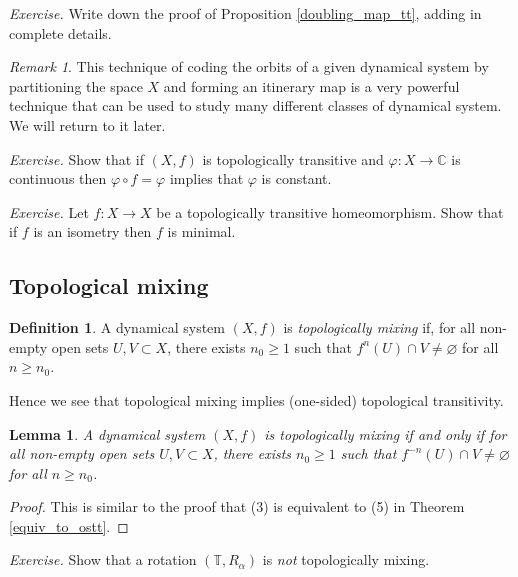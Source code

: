 \documentclass[12pt]{article}
\newtheorem{lemma}[theorem]{Lemma}
\theoremstyle{definition}
\newtheorem{definition}[theorem]{Definition}
\theoremstyle{remark}
\newtheorem{remark}[theorem]{Remark}
\begin{document}
\medskip
\noindent
{\it Exercise.}
Write down
the proof of Proposition \ref{doubling_map_tt}, adding in complete details.

\medskip
\noindent
\begin{remark}
This technique of coding the orbits of a given dynamical system by
partitioning the space $X$ and forming an itinerary map is a very
powerful technique that can be used to study many different classes of
dynamical system. We will return to it later.
\end{remark}

\medskip
\noindent
{\it Exercise.}
Show that if $(X,f)$ is topologically transitive and $\varphi: X \to \mathbb C$ is continuous
then $\varphi \circ f = \varphi$ implies that $\varphi$ is constant.


\medskip
\noindent
{\it Exercise.}
Let $f : X \to X$ be a topologically transitive homeomorphism. Show that if $f$ is an isometry then 
$f$ is minimal. %



\subsection{Topological mixing}

\begin{definition}
A dynamical system $(X,f)$ is {\it topologically mixing} if, for all non-empty open sets $U,V \subset X$,
there exists $n_0 \ge 1$ such that $f^{n}(U) \cap V \ne \varnothing$ for all $n \ge n_0$.
\end{definition}

Hence we see that topological mixing
implies (one-sided) topological transitivity.

\begin{lemma}
A dynamical system $(X,f)$ is topologically mixing if and only if
for all non-empty open sets $U,V \subset X$,
there exists $n_0 \ge 1$ such that $f^{-n}(U) \cap V \ne \varnothing$ for all $n \ge n_0$.
\end{lemma}




\begin{proof}
This is similar to the proof that (3) is equivalent to (5) in Theorem \ref{equiv_to_ostt}.
\end{proof}

\medskip
\noindent
{\it Exercise.}
Show that a rotation $(\mathbb T,R_\alpha)$ is {\it not} topologically mixing.
\end{document}
